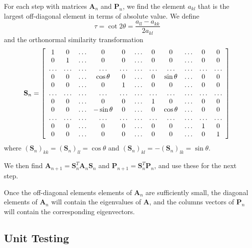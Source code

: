 \documentclass[11pt,a4paper]{article}
\newcommand\V[1]{\mathbf{#1}}                  %
\begin{document}
For each step with matrices $\V{A}_n$ and $\V{P}_n$, we find the element $a_{kl}$ that is the largest off-diagonal element in terms of absolute value. We define
\begin{equation}
  \tau = \cot 2 \theta = \frac{a_{ll} - a_{kk}}{2 a_{kl}}
\end{equation}
and the orthonormal similarity transformation
\begin{equation}
  \V{S}_n = \left[ \begin{array}{*{20}c}
    1 & 0 & \ldots & 0 & 0 & \ldots & 0 & 0 & \ldots & 0 & 0 \\
    0 & 1 & \ldots & 0 & 0 & \ldots & 0 & 0 & \ldots & 0 & 0 \\
    \ldots & \ldots & \ldots & \ldots & \ldots & \ldots & \ldots & \ldots & \ldots & \ldots & \ldots \\
    0 & 0 & \ldots & \cos \theta & 0& \ldots & 0 & \sin \theta & \ldots & 0 & 0 \\
    0 & 0 & \ldots & 0 & 1 & \ldots & 0 & 0 & \ldots & 0 & 0 \\
    \ldots & \ldots & \ldots & \ldots & \ldots & \ldots & \ldots & \ldots & \ldots & \ldots & \ldots \\
    0 & 0 & \ldots & 0 & 0 & \ldots & 1 & 0 & \ldots & 0 & 0 \\
    0 & 0 & \ldots & -\sin\theta & 0 & \ldots & 0 & \cos \theta & \ldots & 0 & 0 \\
    \ldots & \ldots & \ldots & \ldots & \ldots & \ldots & \ldots & \ldots & \ldots & \ldots & \ldots \\
    0 & 0 & \ldots & 0 & 0 & \ldots & 0 & 0 & \ldots & 1 & 0 \\
    0 & 0 & \ldots & 0 & 0 & \ldots & 0 & 0 & \ldots & 0 & 1 \\
  \end{array} \right]
\end{equation}
where $(\V{S}_n)_{kk} = (\V{S}_n)_{ll} = \cos \theta$ and $(\V{S}_n)_{kl} = - (\V{S}_n)_{lk} = \sin \theta$.

We then find $\V{A}_{n+1} = \V{S}_n^T \V{A}_n \V{S}_n$ and $\V{P}_{n+1} = \V{S}_n^T \V{P}_n$, and use these for the next step.

Once the off-diagonal elements elements of $\V{A}_n$ are sufficiently small, the diagonal elements of $\V{A}_n$ will contain the eigenvalues of $\V{A}$, and the columns vectors of $\V{P}_n$ will contain the corresponding eigenvectors.

\subsection{Unit Testing}
\end{document}
